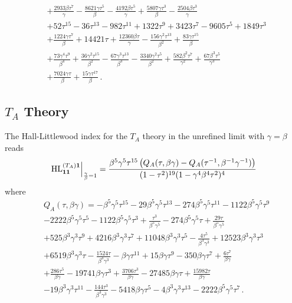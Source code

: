 \documentclass[main.tex]{subfiles}
\begin{document}
\begin{equation}
\begin{aligned}
{   }\\
   &+\frac{2933 \beta  \tau ^7}{\gamma }-\frac{8621 \gamma  \tau ^5}{\beta }-\frac{4192 \beta  \tau ^5}{\gamma }+\frac{5807 \gamma  \tau ^3}{\beta }-\frac{2504 \beta  \tau
   ^3}{\gamma }\\
   &+52 \tau ^{15}-36 \tau ^{13}-982 \tau ^{11}+1322 \tau ^9+3423 \tau ^7-9605 \tau ^5+1849 \tau ^3\\
   &+\frac{1224 \gamma  \tau ^7}{\beta }+14421 \tau+\frac{12360 \beta  \tau }{\gamma }-\frac{156 \gamma ^2 \tau ^{13}}{\beta ^2}+\frac{83 \gamma  \tau ^{15}}{\beta }\\
   &+\frac{73 \gamma ^4
   \tau ^9}{\beta ^4}+\frac{36 \gamma ^2 \tau
   ^{15}}{\beta ^2}-\frac{67 \gamma ^3 \tau ^{13}}{\beta ^3}-\frac{3340 \gamma ^2 \tau ^5}{\beta ^2}+\frac{582 \beta ^2 \tau ^7}{\gamma ^2}+\frac{67 \beta ^3 \tau ^5}{\gamma ^3}\\
   &+\frac{7024 \gamma  \tau }{\beta }+\frac{15 \gamma  \tau ^{17}}{\beta }\,.
\end{aligned}
\label{eqn:Qpolyn}
\end{equation}

\subsection{\texorpdfstring{$T_A$}{TA} Theory}
The Hall-Littlewood index for the $T_A$ theory in the unrefined limit with $\gamma=\beta$ reads
\begin{equation}
\left.\textrm{HL}^{(T_A)\mathbf{1}}_{\mathbf{1}\mathbf{1}}\right|_{\frac{\gamma}{\beta}=1}=\frac{\beta^5\gamma^5\tau^{15}\left(Q_A(\tau,\beta\gamma)-Q_A(\tau^{-1},\beta^{-1}\gamma^{-1})\right)}{(1-\tau^2)^{19}(1-\gamma^4\beta^4\tau^2)^4}
\end{equation}
where 
\begin{equation}
\begin{aligned}\label{eqn:QApolyn}
&Q_A(\tau,\beta\gamma)=-\beta ^5 \gamma ^5 \tau ^{15}-29 \beta ^5 \gamma ^5 \tau ^{13}-274 \beta ^5 \gamma ^5 \tau ^{11}-1122 \beta ^5 \gamma ^5 \tau ^9\\
&-2222 \beta ^5 \gamma ^5 \tau ^5-1122 \beta ^5
   \gamma ^5 \tau ^3+\frac{\tau ^3}{\beta ^5 \gamma ^5}-274 \beta ^5 \gamma ^5 \tau +\frac{29 \tau }{\beta ^5 \gamma ^5}\\
 &+525 \beta ^3 \gamma ^3
   \tau ^9+4216 \beta ^3 \gamma ^3 \tau ^7+11048 \beta ^3 \gamma ^3 \tau ^5-\frac{4 \tau ^5}{\beta ^3 \gamma ^3}+12523 \beta ^3 \gamma ^3 \tau ^3\\
   &+6519 \beta ^3 \gamma ^3
   \tau -\frac{1524 \tau }{\beta ^3 \gamma ^3}-\beta  \gamma  \tau ^{11}+15 \beta  \gamma  \tau ^9-350 \beta  \gamma  \tau ^7+\frac{6 \tau ^7}{\beta  \gamma }\\
   &+\frac{286 \tau
   ^5}{\beta  \gamma }-19741 \beta  \gamma  \tau ^3+\frac{3706 \tau ^3}{\beta  \gamma }-27485 \beta  \gamma  \tau +\frac{15982 \tau }{\beta  \gamma }\\
   &-19 \beta ^3 \gamma ^3 \tau ^{11}-\frac{144 \tau ^3}{\beta ^3 \gamma ^3}-5418 \beta  \gamma  \tau ^5-4 \beta ^3 \gamma ^3 \tau ^{13}-2222 \beta ^5 \gamma ^5 \tau ^7\,.
\end{aligned}
\end{equation}
\end{document}
